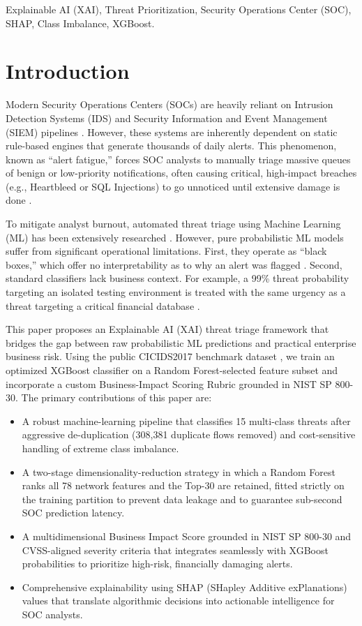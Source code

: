 \documentclass[conference]{IEEEtran}
\begin{document}
\begin{IEEEkeywords}
Explainable AI (XAI), Threat Prioritization, Security Operations Center (SOC), 
SHAP, Class Imbalance, XGBoost.
\end{IEEEkeywords}

\section{Introduction}
Modern Security Operations Centers (SOCs) are heavily reliant on Intrusion Detection Systems (IDS) and Security Information and Event Management (SIEM) pipelines \cite{c1,c2,c3}. However, these systems are inherently dependent on static rule-based engines that generate thousands of daily alerts. This phenomenon, known as ``alert fatigue,'' forces SOC analysts to manually triage massive queues of benign or low-priority notifications, often causing critical, high-impact breaches (e.g., Heartbleed or SQL Injections) to go unnoticed until extensive damage is done \cite{c4,c5,c6}.

To mitigate analyst burnout, automated threat triage using Machine Learning (ML) has been extensively researched \cite{c7,c8,c9}. However, pure probabilistic ML models suffer from significant operational limitations. First, they operate as ``black boxes,'' which offer no interpretability as to why an alert was flagged \cite{c10}. Second, standard classifiers lack business context. For example, a 99\% threat probability targeting an isolated testing environment is treated with the same urgency as a threat targeting a critical financial database \cite{c11,c12}.

This paper proposes an Explainable AI (XAI) threat triage framework that bridges the gap between raw probabilistic ML predictions and practical enterprise business risk. Using the public CICIDS2017 benchmark dataset \cite{c13}, we train an optimized XGBoost classifier on a Random Forest-selected feature subset and incorporate a custom Business-Impact Scoring Rubric grounded in NIST SP 800-30. The primary contributions of this paper are:

\begin{itemize}
    \item A robust machine-learning pipeline that classifies 15 multi-class threats after aggressive de-duplication (308{,}381 duplicate flows removed) and cost-sensitive handling of extreme class imbalance.
    \item A two-stage dimensionality-reduction strategy in which a Random Forest ranks all 78 network features and the Top-30 are retained, fitted strictly on the training partition to prevent data leakage and to guarantee sub-second SOC prediction latency.
    \item A multidimensional Business Impact Score grounded in NIST SP 800-30 and CVSS-aligned severity criteria that integrates seamlessly with XGBoost probabilities to prioritize high-risk, financially damaging alerts.
    \item Comprehensive explainability using SHAP (SHapley Additive exPlanations) values that translate algorithmic decisions into actionable intelligence for SOC analysts.
\end{itemize}
\end{document}
